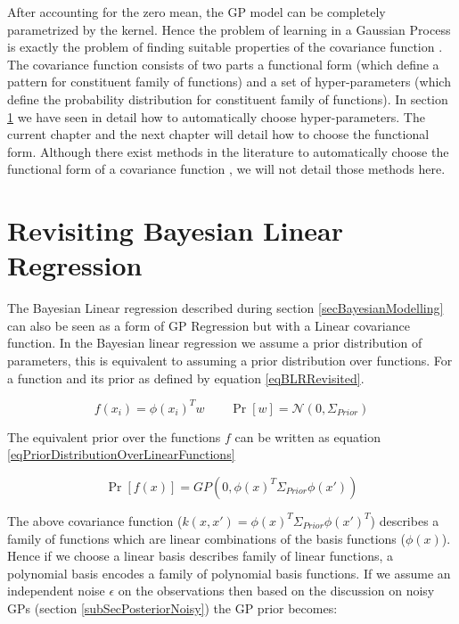 After accounting for the zero mean, the GP model can be completely parametrized by the kernel. Hence the problem of learning in a Gaussian Process is exactly the problem of finding suitable properties of the covariance function \cite{rasmussen2006gaussian}. The covariance function consists of two parts a functional form (which define a pattern for constituent family of functions) and a set of hyper-parameters (which define the probability distribution for constituent family of functions). In section \ref{} we have seen in detail how to automatically choose hyper-parameters. The current chapter and the next chapter will detail how to choose the functional form. Although there exist methods in the literature to automatically choose the functional form of a covariance function \cite{duvenaud-thesis-2014, lloyd2014automatic, automaticStatistician}, we will not detail those methods here. 

\section{Revisiting Bayesian Linear Regression}
The Bayesian Linear regression described during section \ref{secBayesianModelling} can also be seen as a form of GP Regression but with a Linear covariance function.
In the Bayesian linear regression we assume a prior distribution of parameters, this is equivalent to assuming a prior distribution over functions. For a function and its prior as defined by equation \ref{eqBLRRevisited}.

\begin{equation}\label{eqBLRRevisited}
    f(x_{i}) = \phi(x_{i})^{T}w
\quad \quad \Pr[w] = \mathcal{N}(0, \Sigma_{Prior}) 
\end{equation}

The equivalent prior over the functions \(f\) can be written as equation \ref{eqPriorDistributionOverLinearFunctions}

\begin{equation}\label{eqPriorDistributionOverLinearFunctions}
    \Pr[f(x)] = GP(0, \phi(x)^{T} \Sigma_{Prior} \phi(x'))
\end{equation}

The above covariance function (\(k(x, x') = \phi(x)^{T} \Sigma_{Prior} \phi(x')^{T}\)) describes a family of functions which are linear combinations of the basis functions (\(\phi(x)\)). Hence if we choose a linear basis describes family of linear functions, a polynomial basis encodes a family of polynomial basis functions. If we assume an independent noise \(\epsilon\) on the observations then based on the discussion on noisy GPs (section \ref{subSecPosteriorNoisy}) the GP prior becomes:


